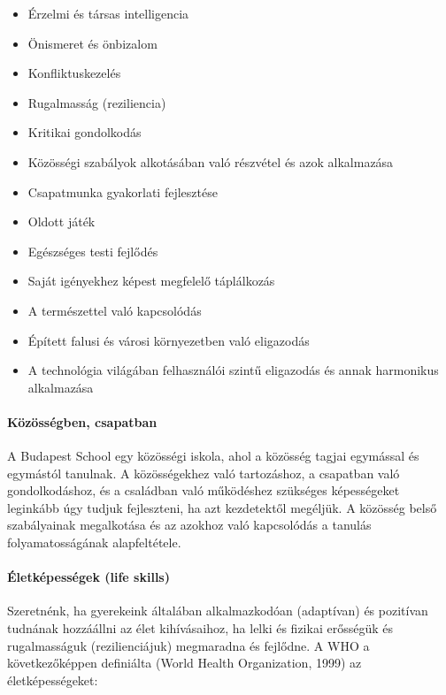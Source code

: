 \begin{itemize}

\item
  Érzelmi és társas intelligencia
\item
  Önismeret és önbizalom
\item
  Konfliktuskezelés
\item
  Rugalmasság (reziliencia)
\item
  Kritikai gondolkodás
\item
  Közösségi szabályok alkotásában való részvétel és azok alkalmazása
\item
  Csapatmunka gyakorlati fejlesztése
\item
  Oldott játék
\item
  Egészséges testi fejlődés
\item
  Saját igényekhez képest megfelelő táplálkozás
\item
  A természettel való kapcsolódás
\item
  Épített falusi és városi környezetben való eligazodás
\item
  A technológia világában felhasználói szintű eligazodás és annak
  harmonikus alkalmazása
\end{itemize}

\paragraph{Közösségben,
csapatban}\label{kuxf6zuxf6ssuxe9gben-csapatban}

A Budapest School egy közösségi iskola, ahol a közösség tagjai egymással
és egymástól tanulnak. A közösségekhez való tartozáshoz, a csapatban
való gondolkodáshoz, és a családban való működéshez szükséges
képességeket leginkább úgy tudjuk fejleszteni, ha azt kezdetektől
megéljük. A közösség belső szabályainak megalkotása és az azokhoz való
kapcsolódás a tanulás folyamatosságának alapfeltétele.

\paragraph{Életképességek (life
skills)}\label{uxe9letkuxe9pessuxe9gek-life-skills}

Szeretnénk, ha gyerekeink általában alkalmazkodóan (adaptívan) és
pozitívan tudnának hozzáállni az élet kihívásaihoz, ha lelki és fizikai
erősségük és rugalmasságuk (rezilienciájuk) megmaradna és fejlődne. A
WHO a következőképpen definiálta (World Health Organization, 1999) az
életképességeket:

